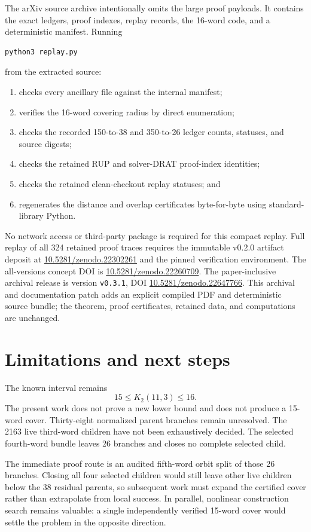 \documentclass[11pt]{article}
\theoremstyle{definition}
\theoremstyle{remark}
\begin{document}
The arXiv source archive intentionally omits the large proof payloads.
It contains the exact ledgers, proof indexes, replay records, the
16-word code, and a deterministic manifest.  Running
\begin{verbatim}
python3 replay.py
\end{verbatim}
from the extracted source:
\begin{enumerate}
  \item checks every ancillary file against the internal manifest;
  \item verifies the 16-word covering radius by direct enumeration;
  \item checks the recorded 150-to-38 and 350-to-26 ledger counts,
        statuses, and source digests;
  \item checks the retained RUP and solver-DRAT proof-index identities;
  \item checks the retained clean-checkout replay statuses; and
  \item regenerates the distance and overlap certificates
        byte-for-byte using standard-library Python.
\end{enumerate}
No network access or third-party package is required for this compact
replay.  Full replay of all 324 retained proof traces requires the
immutable v0.2.0 artifact deposit at
\href{https://doi.org/10.5281/zenodo.22302261}
{10.5281/zenodo.22302261} and the pinned verification environment.
The all-versions concept DOI is
\href{https://doi.org/10.5281/zenodo.22260709}
{10.5281/zenodo.22260709}.
The paper-inclusive archival release is version \texttt{v0.3.1}, DOI
\href{https://doi.org/10.5281/zenodo.22647766}
{10.5281/zenodo.22647766}.  This archival and documentation patch adds
an explicit compiled PDF and deterministic source bundle; the theorem,
proof certificates, retained data, and computations are unchanged.

\section{Limitations and next steps}

The known interval remains
\[
  15\leq K_2(11,3)\leq16.
\]
The present work does not prove a new lower bound and does not produce
a 15-word cover.  Thirty-eight normalized parent branches remain
unresolved.  The 2163 live third-word children have not been
exhaustively decided.  The selected fourth-word bundle leaves 26
branches and closes no complete selected child.

The immediate proof route is an audited fifth-word orbit split of those
26 branches.  Closing all four selected children would still leave
other live children below the 38 residual parents, so subsequent work
must expand the certified cover rather than extrapolate from local
success.  In parallel, nonlinear construction search remains valuable:
a single independently verified 15-word cover would settle the problem
in the opposite direction.
\end{document}
